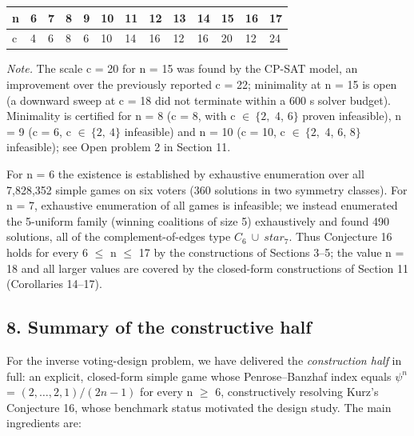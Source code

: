 \documentclass[
]{article}
\newcounter{none} %
\begin{document}
{\def\LTcaptype{none} %
\begin{longtable}[]{@{}lllllllllllll@{}}
\toprule\noalign{}
n & 6 & 7 & 8 & 9 & 10 & 11 & 12 & 13 & 14 & 15 & 16 & 17 \\
\midrule\noalign{}
\endhead
\bottomrule\noalign{}
\endlastfoot
c & 4 & 6 & 8 & 6 & 10 & 14 & 16 & 12 & 16 & 20 & 12 & 24 \\
\end{longtable}
}

\emph{Note.} The scale c = 20 for n = 15 was found by the CP-SAT model,
an improvement over the previously reported c = 22; minimality at n = 15
is open (a downward sweep at c = 18 did not terminate within a 600 s
solver budget). Minimality is certified for n = 8 (c = 8, with c
\(\in\ \{2,\) 4, \(6\}\) proven infeasible), n = 9 (c = 6, c
\(\in\ \{2,\ 4\}\) infeasible) and n = 10 (c = 10, c \(\in\ \{2,\) 4, 6,
\(8\}\) infeasible); see Open problem 2 in Section 11.

For n = 6 the existence is established by exhaustive enumeration over
all 7,828,352 simple games on six voters (360 solutions in two symmetry
classes). For n = 7, exhaustive enumeration of all games is infeasible;
we instead enumerated the 5-uniform family (winning coalitions of size
5) exhaustively and found 490 solutions, all of the complement-of-edges
type \(C_6\ \cup\ star_7.\) Thus Conjecture 16 holds for every 6 \(\le\)
n \(\le\) 17 by the constructions of Sections 3--5; the value n = 18 and
all larger values are covered by the closed-form constructions of
Section 11 (Corollaries 14--17).

\subsection{8. Summary of the constructive
half}\label{summary-of-the-constructive-half}

For the inverse voting-design problem, we have delivered the
\emph{construction half} in full: an explicit, closed-form simple game
whose Penrose--Banzhaf index equals \(\psi^n\) =
\((2,\dots,2,1)/(2n-1)\) for every n \(\ge\) 6, constructively resolving
Kurz's Conjecture 16, whose benchmark status motivated the design study.
The main ingredients are:
\end{document}
